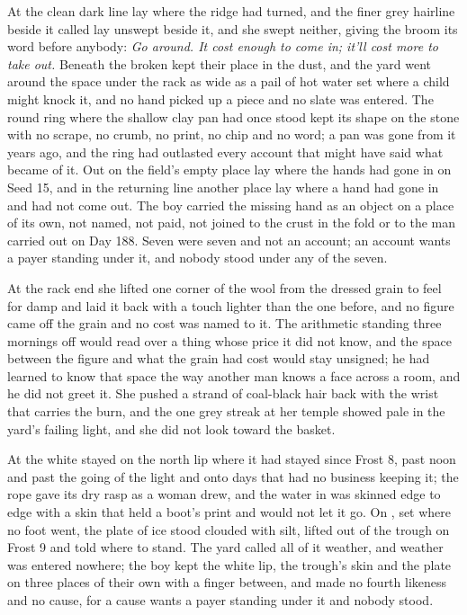 At  the clean dark line lay where the ridge had turned, and the finer grey hairline beside it called  lay unswept beside it, and she swept neither, giving the broom its word before anybody: \emph{Go around. It cost enough to come in; it'll cost more to take out.} Beneath  the broken  kept their place in the dust, and the yard went around the space under the rack as wide as a pail of hot water set where a child might knock it, and no hand picked up a piece and no slate was entered. The round ring where the shallow clay pan had once stood kept its shape on the stone with no scrape, no crumb, no print, no chip and no word; a pan was gone from it years ago, and the ring had outlasted every account that might have said what became of it. Out on  the field's empty place lay where the hands had gone in on Seed 15, and in the returning line another place lay where a hand had gone in and had not come out. The boy carried the missing hand as an object on a place of its own, not named, not paid, not joined to the crust in the fold or to the man carried out on Day 188. Seven were seven and not an account; an account wants a payer standing under it, and nobody stood under any of the seven.

At the rack end she lifted one corner of the wool from the dressed grain to feel for damp and laid it back with a touch lighter than the one before, and no figure came off the grain and no cost was named to it. The arithmetic standing three mornings off would read over a thing whose price it did not know, and the space between the figure and what the grain had cost would stay unsigned; he had learned to know that space the way another man knows a face across a room, and he did not greet it. She pushed a strand of coal-black hair back with the wrist that carries the burn, and the one grey streak at her temple showed pale in the yard's failing light, and she did not look toward the basket.

\scenebreak

At  the white  stayed on the north lip where it had stayed since Frost 8, past noon and past the going of the light and onto days that had no business keeping it; the rope gave its dry rasp as a woman drew, and the water in  was skinned edge to edge with a skin that held a boot's print and would not let it go. On , set where no foot went, the plate of ice stood clouded with silt, lifted out of the trough on Frost 9 and told where to stand. The yard called all of it weather, and weather was entered nowhere; the boy kept the white lip, the trough's skin and the plate on three places of their own with a finger between, and made no fourth likeness and no cause, for a cause wants a payer standing under it and nobody stood.


